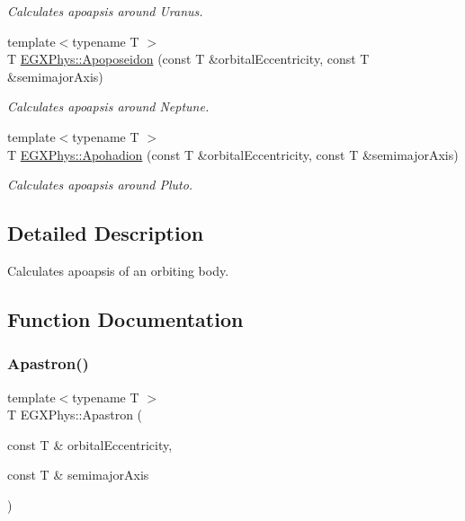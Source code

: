 \begin{DoxyCompactItemize}
\begin{DoxyCompactList}\small\item\em Calculates apoapsis around Uranus. \end{DoxyCompactList}\item 
{\footnotesize template$<$typename T $>$ }\\T \hyperlink{group___e_g_x_phys-_apoapsis_ga89679654fff13176e989536163a27f9d}{E\+G\+X\+Phys\+::\+Apoposeidon} (const T \&orbital\+Eccentricity, const T \&semimajor\+Axis)
\begin{DoxyCompactList}\small\item\em Calculates apoapsis around Neptune. \end{DoxyCompactList}\item 
{\footnotesize template$<$typename T $>$ }\\T \hyperlink{group___e_g_x_phys-_apoapsis_gaa16847ddc5763c327067075dcb6a3353}{E\+G\+X\+Phys\+::\+Apohadion} (const T \&orbital\+Eccentricity, const T \&semimajor\+Axis)
\begin{DoxyCompactList}\small\item\em Calculates apoapsis around Pluto. \end{DoxyCompactList}\end{DoxyCompactItemize}


\subsection{Detailed Description}
Calculates apoapsis of an orbiting body. 

\subsection{Function Documentation}
\mbox{\label{group___e_g_x_phys-_apoapsis_ga2fc1c406ce10f59b4f325150aecd279a}} 
\subsubsection{\texorpdfstring{Apastron()}{Apastron()}}
{\footnotesize\ttfamily template$<$typename T $>$ \\
T E\+G\+X\+Phys\+::\+Apastron (\begin{DoxyParamCaption}\item[{const T \&}]{orbital\+Eccentricity,  }\item[{const T \&}]{semimajor\+Axis }\end{DoxyParamCaption})}



